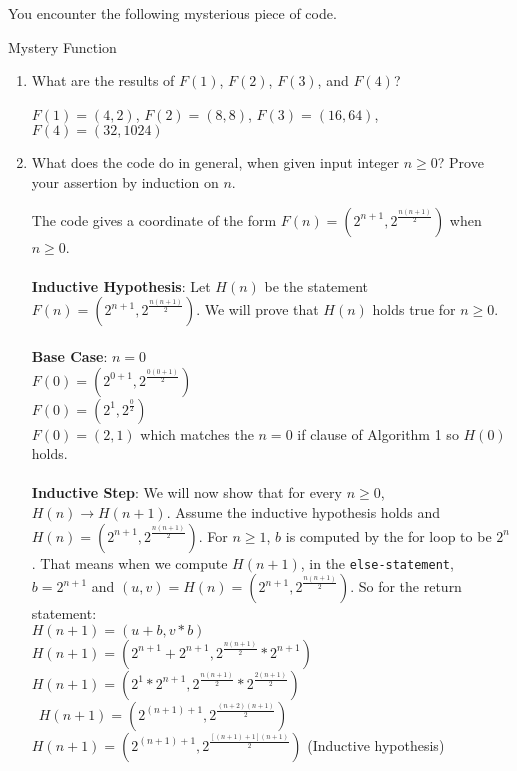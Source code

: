 \documentclass[11pt]{article}
\theoremstyle{definition}
\theoremstyle{theorem}
\newcommand{\solution}[1]{\medskip\noindent{\color{DarkBlue}\textbf{Solution:}} #1}
\newcommand{\solution}[1]{}
\begin{document}
\noindent You encounter the following mysterious piece of code.

\begin{algorithm}[H]
\caption{Mystery Function}
\end{algorithm}

\begin{enumerate}[label=(\alph*)]
\item What are the results of $F(1)$, $F(2)$, $F(3)$, and $F(4)$?  

\solution{
$F(1) = (4, 2)$, $F(2) = (8, 8)$, $F(3) = (16, 64)$, $F(4) = (32, 1024)$
}

\item What does the code do in general, when given input integer $n
  \ge 0$? Prove your assertion by induction on $n$.

\solution{
The code gives a coordinate of the form $F(n) = (2^{n + 1}, 2^{\frac{n(n + 1)}{2}})$ when $n \ge 0$.\\\\
\textbf{Inductive Hypothesis}: Let $H(n)$ be the statement $F(n) = (2^{n + 1}, 2^{\frac{n(n + 1)}{2}})$. We will prove that $H(n)$ holds true for $n \ge 0$. \\\\
\textbf{Base Case}: $n = 0$ \\
$F(0) = (2^{0 + 1}, 2^{\frac{0(0 + 1)}{2}})$ \\
$F(0) = (2^{1}, 2^{\frac{0}{2}})$ \\
$F(0) = (2, 1)$ which matches the $n = 0$ if clause of Algorithm 1 so $H(0)$ holds. \\\\
\textbf{Inductive Step}: We will now show that for every $n \ge 0$, $H(n) \rightarrow H(n + 1)$. Assume the inductive hypothesis holds and $H(n) = (2^{n + 1}, 2^{\frac{n(n + 1)}{2}})$. For $n \ge 1$, $b$ is computed by the for loop to be $2^{n}$. That means when we compute $H(n + 1)$, in the \texttt{else-statement}, $b = 2^{n + 1}$ and $(u, v) = H(n) = (2^{n + 1}, 2^{\frac{n(n + 1)}{2}})$. So for the return statement: \\
$H(n + 1) = (u + b, v * b)$ \\
$H(n + 1) = (2^{n + 1} + 2^{n + 1}, 2^{\frac{n(n + 1)}{2}} * 2^{n + 1})$ \\
$H(n + 1) = (2^{1} * 2^{n + 1}, 2^{\frac{n(n + 1)}{2}} * 2^{\frac{2(n + 1)}{2}})$ \\\
$H(n + 1) = (2^{(n + 1) + 1}, 2^{\frac{(n + 2)(n + 1)}{2}})$ \\
$H(n + 1) = (2^{(n + 1) + 1}, 2^{\frac{[(n + 1) + 1](n + 1)}{2}})$ (Inductive hypothesis)
}
\end{enumerate}
\end{document}
